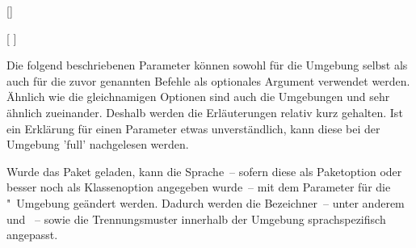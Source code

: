 \begin{Declaration*}{}
\begin{Declaration*}{}
\begin{Declaration*}{}
\begin{Declaration}{[]}
\begin{Declaration}{%
  [%
  ]%
}
\begin{Declaration}{}
\begin{Declaration}{}
\begin{Declaration}{%
}
\begin{Declaration}{%
}
\begin{Declaration}{}
\begin{Declaration}{%
}
\begin{Declaration}{}
\begin{Declaration}{}
\begin{Declaration}{}
Die folgend beschriebenen Parameter können sowohl für die Umgebung 
 selbst als auch für die zuvor genannten Befehle als 
optionales Argument verwendet werden. Ähnlich wie die gleichnamigen Optionen 
sind auch die Umgebungen  und  
sehr ähnlich zueinander. Deshalb werden die Erläuterungen relativ kurz 
gehalten. Ist ein Erklärung für einen Parameter etwas unverständlich, kann 
diese bei der Umgebung 'full' nachgelesen werden.

Wurde das Paket  geladen, kann die Sprache~-- sofern diese als 
Paketoption oder besser noch als Klassenoption angegeben wurde~-- mit dem 
Parameter  für die 
"~Umgebung geändert werden. Dadurch werden die 
Bezeichner~-- unter anderem  und ~-- 
sowie die Trennungsmuster innerhalb der Umgebung sprachspezifisch angepasst. 


\end{Declaration}
\end{Declaration}
\end{Declaration}
\end{Declaration}
\end{Declaration}
\end{Declaration}
\end{Declaration}
\end{Declaration}
\end{Declaration}
\end{Declaration}
\end{Declaration}
\end{Declaration*}
\end{Declaration*}
\end{Declaration*}
